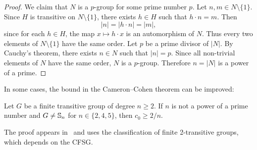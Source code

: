 \begin{proof}
    We claim that $N$ is a $p$-group for some prime number $p$. Let $n,m\in N\setminus\{1\}$. Since $H$ is transitive on $N\setminus\{1\}$, 
    there exists $h\in H$ such that $h\cdot n=m$. Then
    \[
    |n|=|h\cdot n|=|m|,
    \]
    since for each $h\in H$, the map 
    $x\mapsto h\cdot x$ is an automorphism of $N$. Thus every two elements of $N\setminus\{1\}$ have 
    the same order. Let $p$ be a prime divisor 
    of $|N|$. By Cauchy's theorem, there exists 
    $n\in N$ such that $|n|=p$. Since all non-trivial
    elements of $N$ have the same order, 
    $N$ is a $p$-group. Therefore 
    $n=|N|$ is a power of a prime.
\end{proof}


\begin{optional}
    
In some cases, the bound in the 
Cameron--Cohen theorem can be improved:

\begin{theorem}
    Let $G$ be a finite transitive group of degree $n\geq2$. If $n$ 
    is not a power of a prime number and 
    $G\ne\mathbb{S}_n$ for $n\in\{2,4,5\}$, then $c_0\geq 2/n$.
\end{theorem}

The proof appears in~\cite{MR1484879} and uses
the classification of finite 2-transitive groups, 
which depends on the CFSG. 
\end{optional}








    
